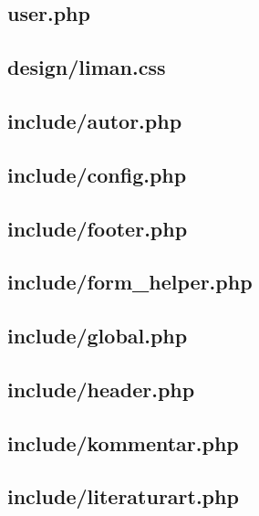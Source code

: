 \subsection{user.php}


\subsection{design/liman.css}


\subsection{include/autor.php}


\subsection{include/config.php}


\subsection{include/footer.php}


\subsection{include/form\_helper.php}


\subsection{include/global.php}


\subsection{include/header.php}


\subsection{include/kommentar.php}


\subsection{include/literaturart.php}


